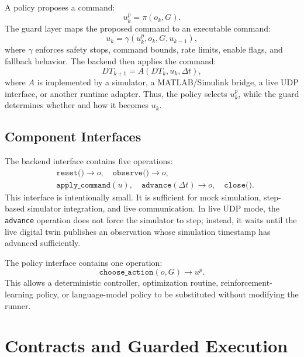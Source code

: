 \documentclass[conference]{IEEEtran}
\begin{document}
A policy proposes a command:
\begin{equation}
    u_k^p = \pi(o_k, G).
\end{equation}
The guard layer maps the proposed command to an executable command:
\begin{equation}
    u_k = \gamma(u_k^p, o_k, G, u_{k-1}),
\end{equation}
where $\gamma$ enforces safety stops, command bounds, rate limits, enable
flags, and fallback behavior. The backend then applies the command:
\begin{equation}
    DT_{k+1} = A(DT_k, u_k, \Delta t),
\end{equation}
where $A$ is implemented by a simulator, a MATLAB/Simulink bridge, a live UDP
interface, or another runtime adapter. Thus, the policy selects $u_k^p$, while
the guard determines whether and how it becomes $u_k$.

\subsection{Component Interfaces}

The backend interface contains five operations:
\begin{equation}
\begin{split}
    &\texttt{reset()} \rightarrow o, \quad
    \texttt{observe()} \rightarrow o, \\
    &\texttt{apply\_command}(u), \quad
    \texttt{advance}(\Delta t) \rightarrow o, \quad
    \texttt{close()}.
\end{split}
\end{equation}
This interface is intentionally small. It is sufficient for mock simulation,
step-based simulator integration, and live communication. In live UDP mode,
the \texttt{advance} operation does not force the simulator to step; instead,
it waits until the live digital twin publishes an observation whose simulation
timestamp has advanced sufficiently.

The policy interface contains one operation:
\begin{equation}
    \texttt{choose\_action}(o, G) \rightarrow u^p.
\end{equation}
This allows a deterministic controller, optimization routine,
reinforcement-learning policy, or language-model policy to be substituted
without modifying the runner.

\section{Contracts and Guarded Execution}
\end{document}
